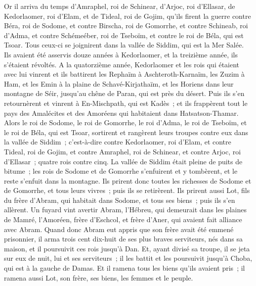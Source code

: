 \begin{multicols}{2}
\VerseOne{}Or il arriva du temps d'Amraphel, roi de Schinear, d'Arjoc, roi d'Ellasar, de Kedorlaomer, roi d'Elam, et de Tideal, roi de Gojim,
qu'ils firent la guerre contre Béra, roi de Sodome, et contre Birscha, roi de Gomorrhe, et contre Schineab, roi d'Adma, et contre Schémeéber, roi de Tseboïm, et contre le roi de Béla, qui est Tsoar.
Tous ceux-ci se joignirent dans la vallée de Siddim, qui est la Mer Salée.
Ils avaient été asservis douze années à Kedorlaomer, et la treizième année, ils s'étaient révoltés.
A la quatorzième année, Kedorlaomer et les rois qui étaient avec lui vinrent et ils battirent les Rephaïm à Aschteroth-Karnaïm, les Zuzim à Ham, et les Emin à la plaine de Schavé-Kirjathaïm,
et les Horiens dans leur montagne de Séir, jusqu'au chêne de Paran, qui est près du désert.
Puis ils s'en retournèrent et vinrent à En-Mischpath, qui est Kadès~; et ils frappèrent tout le pays des Amalécites et des Amoréens qui habitaient dans Hatsatson-Thamar.
Alors le roi de Sodome, le roi de Gomorrhe, le roi d'Adma, le roi de Tseboïm, et le roi de Béla, qui est Tsoar, sortirent et rangèrent leurs troupes contre eux dans la vallée de Siddim~;
c'est-à-dire contre Kedorlaomer, roi d'Elam, et contre Tideal, roi de Gojim, et contre Amraphel, roi de Schinear, et contre Arjoc, roi d'Ellasar~; quatre rois contre cinq.
La vallée de Siddim était pleine de puits de bitume~; les rois de Sodome et de Gomorrhe s'enfuirent et y tombèrent, et le reste s'enfuit dans la montagne.
Ils prirent donc toutes les richesses de Sodome et de Gomorrhe, et tous leurs vivres~; puis ils se retirèrent.
Ils prirent aussi Lot, fils du frère d'Abram, qui habitait dans Sodome, et tous ses biens~; puis ils s'en allèrent.
Un fuyard vint avertir Abram, l'Hébreu, qui demeurait dans les plaines de Mamré, l'Amoréen, frère d'Eschcol, et frère d'Aner, qui avaient fait alliance avec Abram.
Quand donc Abram eut appris que son frère avait été emmené prisonnier, il arma trois cent dix-huit de ses plus braves serviteurs, nés dans sa maison, et il poursuivit ces rois jusqu'à Dan.
Et, ayant divisé sa troupe, il se jeta sur eux de nuit, lui et ses serviteurs~; il les battit et les poursuivit jusqu'à Choba, qui est à la gauche de Damas.
Et il ramena tous les biens qu'ils avaient pris~; il ramena aussi Lot, son frère, ses biens, les femmes et le peuple.

\end{multicols}
